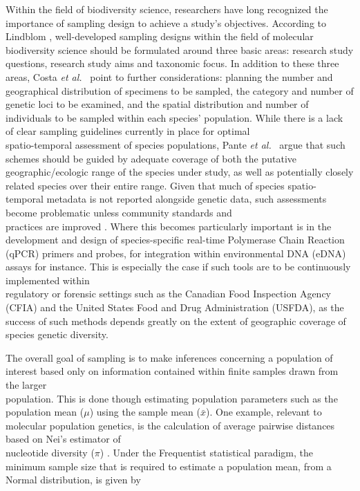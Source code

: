 Within the field of biodiversity science, researchers have long recognized the \\ importance of sampling design to achieve a study's objectives. According to Lindblom \cite{lindblom2009sample}, well-developed sampling designs within the field of molecular biodiversity science should be formulated around three basic areas: research study questions, research study aims and taxonomic focus. In addition to these three areas,  Costa \textit{et al.}~\cite{costa2015conservation} point to further considerations: planning the number and geographical distribution of specimens to be sampled, the category and number of genetic loci to be examined, and the spatial distribution and number of individuals to be sampled within each species' population. While there is a lack of clear sampling guidelines currently in place for optimal \\ spatio-temporal assessment of species populations, Pante \textit{et al.}~\cite{pante2015species} argue that such \\ schemes should be guided by adequate coverage of both the putative geographic/ecologic range of the species under study, as well as potentially closely related species over their entire range. Given that much of species spatio-temporal metadata is not reported alongside genetic data, such assessments become problematic unless community standards and \\ practices are improved \cite{hanner2009data, naaum2015standards, strohm2016mitogenome}. Where this becomes particularly important is in the development and design of species-specific real-time Polymerase Chain Reaction (qPCR) primers and probes, for integration within environmental DNA (eDNA) assays for instance. This is especially the case if such tools are to be continuously implemented within 
\\ regulatory or forensic settings such as the Canadian Food Inspection Agency (CFIA) \cite{Shehata2018dna} and the United States Food and Drug Administration (USFDA), as the success of such methods depends greatly on the extent of geographic coverage of species genetic diversity.

 

The overall goal of sampling is to make inferences concerning a population of interest based only on information contained within finite samples drawn from the larger \\ population. This is done though estimating population parameters such as the population mean ($\mu$) using the sample mean ($\bar{x}$). One example, relevant to molecular population genetics, is the calculation of average pairwise distances based on Nei's estimator of \\ nucleotide diversity ($\pi$) \cite{nei1979mathematical}. Under the Frequentist statistical paradigm, the minimum sample size that is required to estimate a population mean, from a Normal distribution, is given by \cite{adcock1997sample}

